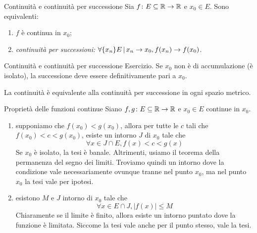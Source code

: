 \documentclass[a4paper]{article}
\begin{document}
\begin{snippettheorem}{Continuità e continuità per successione}
    Sia \(f\colon E \subseteq \mathbb{R} \to \mathbb{R}\) e \(x_0\in E\).
    Sono equivalenti:
    \begin{enumerate}
        \item \(f\) è continua in \(x_0\);
        \item \emph{continuità per successioni:} \(\forall \{x_n\} E \,|\, x_n \to x_0, f(x_n) \to f(x_0)\).
    \end{enumerate}
\end{snippettheorem}

\begin{snippetproof}{Continuità e continuità per successione}
    Esercizio.
    Se \(x_0\) non è di accumulazione (è isolato), la successione deve essere definitivamente pari a \(x_0\).
    \begin{iffproof}
        \item \todo 
        \item \todo 
    \end{iffproof}
\end{snippetproof}

La continuità è equivalente alla continuità per successione in ogni spazio metrico.

\begin{snippetproposition}{Proprietà delle funzioni continue}
    Siano \(f,g\colon E \subseteq \mathbb{R} \to \mathbb{R}\) e \(x_0\in E\) continue in \(x_0\).
    \begin{enumerate}
        \item supponiamo che \(f(x_0) < g(x_0)\), allora per tutte le \(c\) tali che \(f(x_0) < c < g(x_0)\),
        esiste un intorno \(J\) di \(x_0\) tale che
        \[  \forall x \in J \cap E, f(x) < c < g(x) \]
        Se \(x_0\) è isolato, la tesi è banale. Altrimenti, usiamo il teorema della permanenza del segno dei limiti.
        Troviamo quindi un intorno dove la condizione vale necessariamente ovunque tranne nel punto \(x_0\), ma nel punto \(x_0\)
        la tesi vale per ipotesi.
        \item esistono \(M\) e \(J\) intorno di \(x_0\) tale che
            \[
                \forall x\in E \cap J, |f(x)|\leq M
            \]
            Chiaramente se il limite è finito, allora esiste un intorno puntato dove la funzione è limitata.
            Siccome la tesi vale anche per il punto stesso, vale la tesi.
    \end{enumerate}
\end{snippetproposition}
\end{document}
